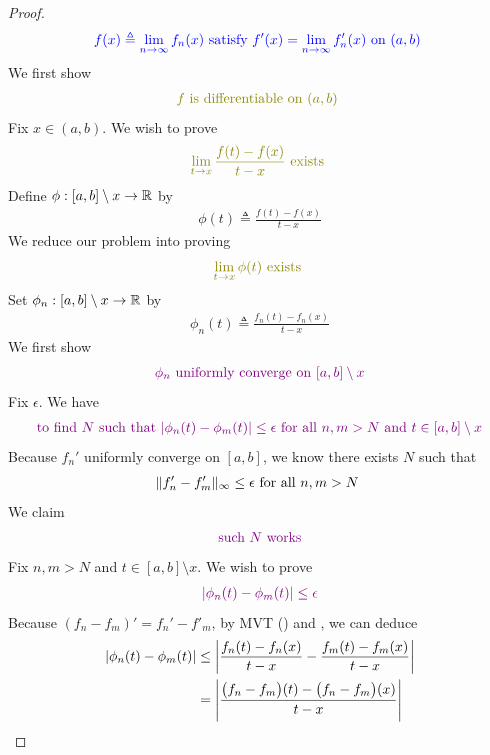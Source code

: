 \documentclass{report}
\begin{document}
\begin{proof}
\begin{align}
\textcolor{blue}{f(x)\triangleq \lim_{n\to \infty}f_n(x)\text{ satisfy }f'(x)=\lim_{n\to \infty}f'_n(x)\text{ on $(a,b)$ }}
\end{align}
We first show 
\begin{align*}
\olive{f\text{ is differentiable on $(a,b)$ }}
\end{align*}
Fix $x \in (a,b)$. We wish to prove
\begin{align*}
  \olive{{\lim_{t\to x}\frac{f(t)-f(x)}{t-x}\text{ exists }}}
\end{align*}
Define $\phi :[a,b]\setminus x\rightarrow \mathbb{R}$ by 
\begin{align*}
\phi (t)\triangleq \frac{f(t)-f(x)}{t-x}
\end{align*}
We reduce our problem into proving 
\begin{align*}
  \olive{\lim_{t\to x}\phi (t)\text{ exists }}
\end{align*}
Set $\phi_n:[a,b]\setminus x\rightarrow \mathbb{R}$ by 
\begin{align*}
\phi_n(t)\triangleq \frac{f_n(t)-f_n(x)}{t-x}
\end{align*}
We first show  
\begin{align}
\label{UCACu}
  \textcolor{violet}{\phi_n\text{ uniformly converge on }[a,b]\setminus x}
\end{align}
Fix $\epsilon $. We have
\begin{align*}
  \textcolor{violet}{\text{ to find $N$ such that  $\left|\phi_n(t)-\phi _m(t)\right|\leq \epsilon $ for all $n,m>N$ and  $t\in [a,b]\setminus x$ }}
\end{align*}
Because $f_n'$ uniformly converge on  $[a,b]$, we know there exists $N$ such that 
 \begin{align}
\label{CUaC1}
\| f_n'-f_m' \|_\infty\leq \epsilon \text{ for all $n,m>N$ }
\end{align}
We claim 
\begin{align*}
\textcolor{violet}{\text{ such }N\text{ works }}
\end{align*}
Fix $n,m>N$ and $t \in [a,b]\setminus x$. We wish to prove 
\begin{align*}
\textcolor{violet}{\left|\phi_n(t)-\phi_m(t)\right|\leq \epsilon }
\end{align*}
Because $(f_n-f_m)'=f_n'-f'_m$, by MVT () and , we can deduce 
\begin{align*}
  \abso{\phi_n(t)-\phi_m(t)}&\leq \abso{\frac{f_n(t)-f_n(x)}{t-x}-\frac{f_m(t)-f_m(x)}{t-x}}\\
                            &=\abso{\frac{\big(f_n-f_m\big)(t)-\big(f_n-f_m\big)(x)}{t-x}}\\

\end{align*}
\end{proof}
\end{document}

